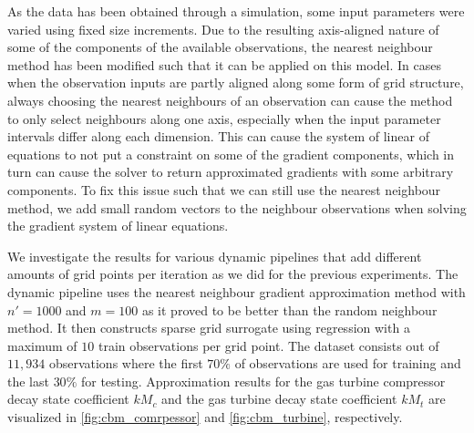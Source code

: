 \documentclass[
  a4paper,  %
  twoside,  %
  bibliography=totoc,
  headsepline,
  cleardoublepage=empty,
  parskip=half,
  draft=false
]{scrbook}
\begin{document}
As the data has been obtained through a simulation, some input parameters were varied using fixed size increments.
Due to the resulting axis-aligned nature of some of the components of the available observations, the nearest neighbour method has been modified such that it can be applied on this model.
In cases when the observation inputs are partly aligned along some form of grid structure, always choosing the nearest neighbours of an observation can cause the method to only select neighbours along one axis, especially when the input parameter intervals differ along each dimension.
This can cause the system of linear of equations to not put a constraint on some of the gradient components, which in turn can cause the solver to return approximated gradients with some arbitrary components.
To fix this issue such that we can still use the nearest neighbour method, we add small random vectors to the neighbour observations when solving the gradient system of linear equations.

We investigate the results for various dynamic pipelines that add different amounts of grid points per iteration as we did for the previous experiments.
The dynamic pipeline uses the nearest neighbour gradient approximation method with $n'=1000$ and $m=100$ as it proved to be better than the random neighbour method.
It then constructs sparse grid surrogate using regression with a maximum of $10$ train observations per grid point.
The dataset consists out of $11,934$ observations where the first $70\%$ of observations are used for training and the last $30\%$ for testing.
Approximation results for the gas turbine compressor decay state coefficient $kM_c$ and the gas turbine decay state coefficient $kM_t$ are visualized in \cref{fig:cbm_comrpessor} and \cref{fig:cbm_turbine}, respectively.
\end{document}
